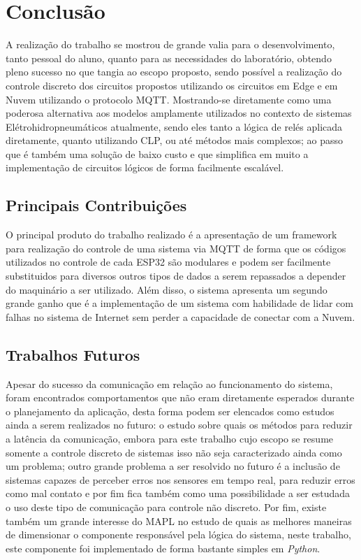 \chapter[Conclusão]{Conclusão}

A realização do trabalho se mostrou de grande valia para o desenvolvimento, tanto pessoal do aluno, quanto para as 
necessidades do laboratório, obtendo pleno sucesso no que tangia ao escopo proposto, sendo possível a realização
do controle discreto dos circuitos propostos utilizando os circuitos em Edge e em Nuvem utilizando o protocolo MQTT. 
Mostrando-se diretamente como uma poderosa alternativa aos modelos amplamente utilizados no contexto de sistemas 
Elétrohidropneumáticos atualmente, sendo eles tanto a lógica de relés aplicada diretamente, quanto utilizando \ac{CLP}, ou até métodos 
mais complexos; ao passo que é também uma solução de baixo custo e que simplifica em muito a implementação de circuitos
lógicos de forma facilmente escalável. 

\section{Principais Contribuições}

O principal produto do trabalho realizado é a apresentação de um framework para realização do controle de uma sistema
 via MQTT de forma que os códigos utilizados no controle de cada ESP32 são modulares e podem ser facilmente substituidos
 para diversos outros tipos de dados a serem repassados a depender do maquinário a ser utilizado. Além disso, o sistema
 apresenta um segundo grande ganho que é a implementação de um sistema com habilidade de lidar com falhas no sistema de 
 Internet sem perder a capacidade de conectar com a Nuvem.

\section{Trabalhos Futuros}

Apesar do sucesso da comunicação em relação ao funcionamento do sistema, foram encontrados comportamentos que não eram diretamente
 esperados durante o planejamento da aplicação, desta forma podem ser elencados como estudos ainda a serem realizados no 
 futuro: o estudo sobre quais os métodos para reduzir a latência da comunicação, embora para este trabalho cujo escopo se
 resume somente a controle discreto de sistemas isso não seja caracterizado ainda como um problema; outro grande problema
 a ser resolvido no futuro é a inclusão de sistemas capazes de perceber erros nos sensores em tempo real, para reduzir 
 erros como mal contato e por fim fica também como uma possibilidade a ser estudada o uso deste tipo de comunicação para 
 controle não discreto. Por fim, existe também um grande interesse do \ac{MAPL} no estudo de quais as melhores maneiras 
 de dimensionar o componente responsável pela lógica do sistema, neste trabalho, este componente foi implementado de forma 
 bastante simples em \textit{Python}.